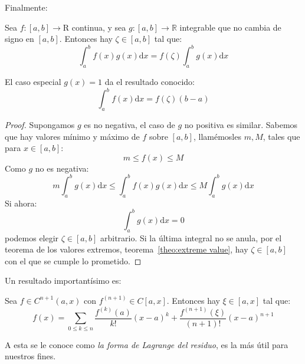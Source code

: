   Finalmente:
  \begin{theorem}
    \label{theo:mean-value-integral}
    Sea \(f \colon [a, b] \to \mathrm{R}\) continua,
    y sea \(g \colon [a, b] \to \mathbb{R}\)
    integrable que no cambia de signo en \([a, b]\).
    Entonces hay \(\zeta \in [a, b]\) tal que:
    \begin{equation*}
      \int_a^b f(x) g(x) \mathrm{d} x
        = f(\zeta) \int_a^b g(x) \mathrm{d} x
    \end{equation*}
  \end{theorem}
  El caso especial \(g(x) = 1\) da el resultado conocido:
  \begin{equation*}
    \int_a^b f(x) \mathrm{d} x
      = f(\zeta) (b - a)
  \end{equation*}
  \begin{proof}
    Supongamos \(g\) es no negativa,
    el caso de \(g\) no positiva es similar.
    Sabemos que hay valores mínimo y máximo de \(f\) sobre \([a, b]\),
    llamémosles \(m, M\),
    tales que para \(x \in [a, b]\):
    \begin{equation*}
      m \le f(x) \le M
    \end{equation*}
    Como \(g\) no es negativa:
    \begin{equation*}
      m \int_a^b g(x) \mathrm{d} x
        \le \int_a^b f(x) g(x) \mathrm{d} x
        \le M \int_a^b g(x) \mathrm{d} x
    \end{equation*}
    Si ahora:
    \begin{equation*}
      \int_a^b g(x) \mathrm{d} x
        = 0
    \end{equation*}
    podemos elegir \(\zeta \in [a, b]\) arbitrario.
    Si la última integral no se anula,
    por el teorema de los valores extremos,
    teorema~\ref{theo:extreme value},
    hay \(\zeta \in [a, b]\) con el que se cumple lo prometido.
  \end{proof}
  Un resultado importantísimo es:
  \begin{theorem}[Taylor]
    \label{theo:taylor}
    Sea \(f \in C^{n + 1}(a, x)\) con \(f^{(n + 1)} \in C[a, x]\).
    Entonces hay \(\xi \in [a, x]\) tal que:
    \begin{equation*}
      f(x)
        = \sum_{0 \le k \le n} \frac{f^{(k)}(a)}{k!} (x - a)^k
            + \frac{f^{(n + 1)}(\xi)}{(n + 1)!} (x - a)^{n + 1}
    \end{equation*}
  \end{theorem}
  A esta se le conoce como \emph{la forma de Lagrange del residuo},
  es la más útil para nuestros fines.
